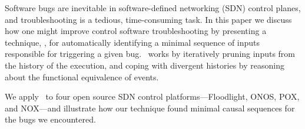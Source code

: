 Software bugs are inevitable in software-defined networking (SDN) control planes,
and troubleshooting
is a tedious, time-consuming task.
In this paper we discuss how one might improve
control software troubleshooting by presenting a technique, \simulator,
for automatically identifying
a minimal sequence of inputs responsible for triggering a given bug.
\Simulator~works by
iteratively pruning inputs from the history of the execution, and
coping with divergent histories by reasoning about the functional equivalence
of events.

We apply \simulator~to four open source SDN control
platforms---Floodlight, ONOS, POX, and NOX---and
illustrate how our technique found minimal causal sequences for
the bugs we encountered.
